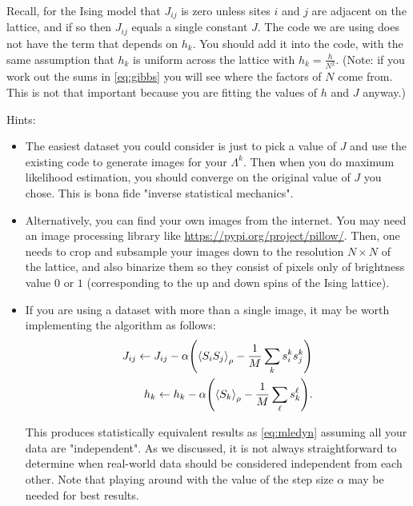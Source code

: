 \documentclass[11pt]{article}
\begin{document}
Recall, for the Ising model that \(J_{ij}\) is zero unless
sites \(i\) and \(j\) are adjacent on the lattice, and if so then \(J_{ij}\)
equals a single constant \(J\). The code we are using does not have the term
that depends on \(h_{k}\). You should add it into the code, with the same
assumption that \(h_{k}\) is uniform across the lattice with
\(h_{k} = \frac{h}{N^{2}}\). (Note: if you work out the sums in
\eqref{eq:gibbs} you will see where the factors of \(N\) come from. This is not
that important because you are fitting the values of \(h\) and \(J\) anyway.)

Hints:
\begin{itemize}
\item The easiest dataset you could consider is just to pick a value of \(J\) and use the existing code to generate images for your \(\Lambda^{k}\). Then when you do maximum likelihood estimation, you should converge on the original value of \(J\) you chose. This is bona fide "inverse statistical mechanics".
\item Alternatively, you can find your own images from the internet. You may need an image processing library like \url{https://pypi.org/project/pillow/}. Then, one needs to crop and subsample your images down to the resolution \(N \times N\) of the lattice, and also binarize them so they consist of pixels only of brightness value \(0\) or \(1\) (corresponding to the up and down spins of the Ising lattice).
\item If you are using a dataset with more than a single image, it may be worth implementing the algorithm as follows:
\begin{align*}
J_{ij} \leftarrow J_{ij} - \alpha \qty(\ev{S_{i}S_{j}}_{\rho} - \frac{1}{M} \sum_{k} s^{k}_{i}s^{k}_{j}) \\
h_{k} \leftarrow h_{k} - \alpha \qty(\ev{S_{k}}_{\rho} - \frac{1}{M} \sum_{\ell} s^{\ell}_{k}).
\end{align*}

This produces statistically equivalent results as \eqref{eq:mledyn} assuming all your data are "independent". As we discussed, it is not always straightforward to determine when real-world data should be considered independent from each other. Note that playing around with the value of the step size \(\alpha\) may be needed for best results.
\end{itemize}
\end{document}
